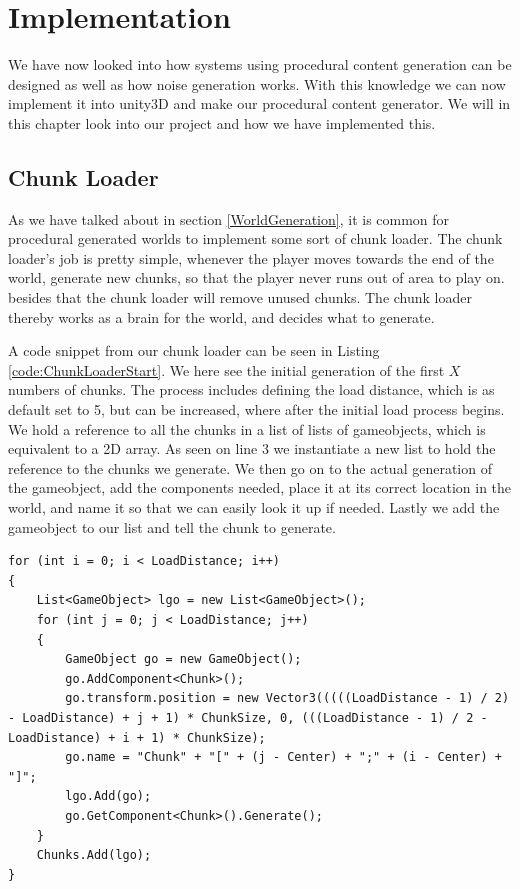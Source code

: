 \chapter{Implementation}

We have now looked into how systems using procedural content generation can be designed as well as how noise generation works. With this knowledge we can now implement it into unity3D and make our procedural content generator. We will in this chapter look into our project and how we have implemented this. %


\section{Chunk Loader}

As we have talked about in section \ref{WorldGeneration}, it is common for procedural generated worlds to implement some sort of chunk loader. The chunk loader's job is pretty simple, whenever the player moves towards the end of the world, generate new chunks, so that the player never runs out of area to play on. besides that the chunk loader will remove unused chunks. The chunk loader thereby works as a brain for the world, and decides what to generate.

A code snippet from our chunk loader can be seen in Listing \ref{code:ChunkLoaderStart}. We here see the initial generation of the first $X$ numbers of chunks. The process includes defining the load distance, which is as default set to 5, but can be increased, where after the initial load process begins. We hold a reference to all the chunks in a list of lists of gameobjects, which is equivalent to a 2D array. As seen on line 3 we instantiate a new list to hold the reference to the chunks we generate. We then go on to the actual generation of the gameobject, add the components needed, place it at its correct location in the world, and name it so that we can easily look it up if needed. Lastly we add the gameobject to our list and tell the chunk to generate.

\begin{lstlisting}[caption = Code snippet from the start method in the Chunk Loader script., label=code:ChunkLoaderStart, language=Csharp]
for (int i = 0; i < LoadDistance; i++)
{
	List<GameObject> lgo = new List<GameObject>();
	for (int j = 0; j < LoadDistance; j++)
	{
		GameObject go = new GameObject();
		go.AddComponent<Chunk>();
		go.transform.position = new Vector3(((((LoadDistance - 1) / 2) - LoadDistance) + j + 1) * ChunkSize, 0, (((LoadDistance - 1) / 2 - LoadDistance) + i + 1) * ChunkSize);
		go.name = "Chunk" + "[" + (j - Center) + ";" + (i - Center) + "]";
		lgo.Add(go);
		go.GetComponent<Chunk>().Generate();
	}
	Chunks.Add(lgo);
}
\end{lstlisting}

